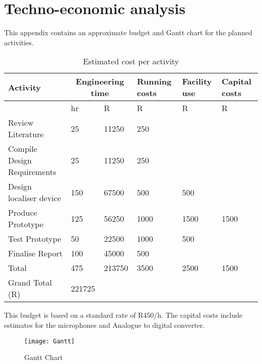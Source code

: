 \chapter{Techno-economic analysis}

This appendix contains an approximate budget and Gantt chart for the planned activities.

\begin{table}[h!]
	\centering
	\begin{tabular}{ | m{15em} | m{3em} | m{3em} |m{4em} | m{4em} | m{4em}| } 
		\hline
		Activity & \multicolumn{2}{|c|}{Engineering time} & Running costs & Facility use & Capital costs \\ 
		\hline
		&hr & R & R & R & R\\
		\hline
		Review Literature &25&11250&250&&\\
		\hline
		Compile Design Requirements&25&11250&250&&\\
		\hline
		Design localiser device&150&67500&500&500&\\
		\hline
		Produce Prototype&125&56250&1000&1500&1500\\
		\hline
		Test Prototype&50&22500&1000&500&\\
		\hline
		Finalise Report&100&45000&500&&\\
		\hline
		Total&475&213750&3500&2500&1500\\
		\hline
		Grand Total (R)&221725&&&&\\ 
		\hline
	\end{tabular}
\caption{Estimated cost per activity}
\end{table}

\noindent This budget is based on a standard rate of R450/h. The capital costs include estimates for the microphones and Analogue to digital converter.

\begin{figure}[h]
	\centering
	\texttt{[image: Gantt]}
	\caption{Gantt Chart}
	\label{fig:mesh1}
\end{figure}